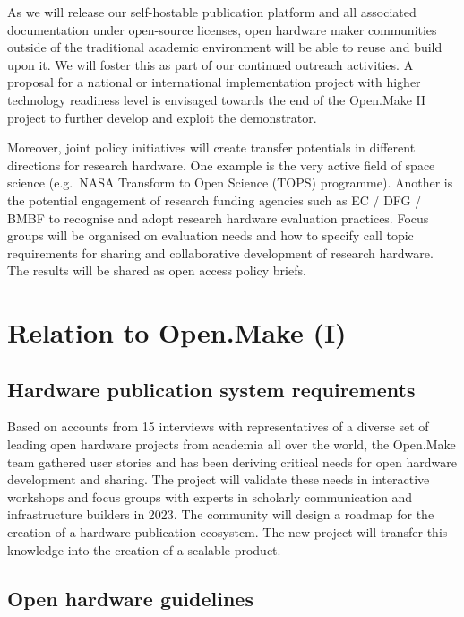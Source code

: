 \documentclass[
  12pt,
  a4paper,
]{article}
\begin{document}
As we will release our self-hostable publication platform and all
associated documentation under open-source licenses, open hardware maker
communities outside of the traditional academic environment will be able
to reuse and build upon it. We will foster this as part of our continued
outreach activities. A proposal for a national or international
implementation project with higher technology readiness level is
envisaged towards the end of the Open.Make II project to further develop
and exploit the demonstrator.

Moreover, joint policy initiatives will create transfer potentials in
different directions for research hardware. One example is the very
active field of space science (e.g.~NASA Transform to Open Science
(TOPS) programme). Another is the potential engagement of research
funding agencies such as EC / DFG / BMBF to recognise and adopt research
hardware evaluation practices. Focus groups will be organised on
evaluation needs and how to specify call topic requirements for sharing
and collaborative development of research hardware. The results will be
shared as open access policy briefs.

\hypertarget{relation-to-open.make-i}{%
\section{Relation to Open.Make (I)}\label{relation-to-open.make-i}}

\hypertarget{hardware-publication-system-requirements}{%
\subsection{Hardware publication system
requirements}\label{hardware-publication-system-requirements}}

Based on accounts from 15 interviews with representatives of a diverse
set of leading open hardware projects from academia all over the world,
the Open.Make team gathered user stories and has been deriving critical
needs for open hardware development and sharing. The project will
validate these needs in interactive workshops and focus groups with
experts in scholarly communication and infrastructure builders in 2023.
The community will design a roadmap for the creation of a hardware
publication ecosystem. The new project will transfer this knowledge into
the creation of a scalable product.

\hypertarget{open-hardware-guidelines}{%
\subsection{Open hardware guidelines}\label{open-hardware-guidelines}}
\end{document}
